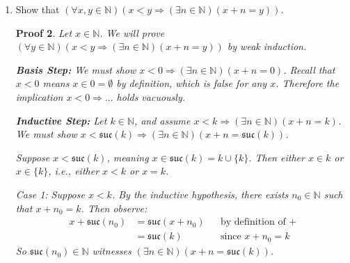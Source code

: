 \documentclass[12pt]{article}
\newcommand{\suc}{\mathfrak{suc}}
\newcommand{\N}{\mathbb{N}}
\theoremstyle{proofstyle}
\newtheorem*{proof*}{Proof}
\begin{document}
\begin{enumerate}[left=0pt, itemsep=2em, parsep=1em]
\begin{enumerate}[label=(\alph*), itemsep=1.5em, leftmargin=2em]
\begin{proof*}
  \medskip
  \textbf{Inductive Step:}
  Let $k \in \N$, and assume $x + k = k + x$. We observe the following.
  \begin{align*}
    x + \suc(k) &= \suc(x + k) &&\text{by definition of }+ \\
                &= \suc(k + x) &&\text{by the inductive hypothesis} \\
                &= \suc(k) + x &&\text{by part (a)}
  \end{align*}
  Therefore $x + \suc(k) = \suc(k) + x$ as desired.

  We can therefore conclude $(\forall y \in \N)(x + y = y + x)$, and since $x$ was arbitrary, $(\forall x, y \in \N)(x + y = y + x)$.
  \end{proof*}

\end{enumerate}

\newpage

\item Show that $(\forall x, y \in \N)(x < y \Rightarrow (\exists n \in \N)(x + n = y))$.

\begin{proof*}
Let $x \in \N$. We will prove $(\forall y \in \N)(x < y \Rightarrow (\exists n \in \N)(x + n = y))$ by weak induction.

\medskip
\textbf{Basis Step:}
We must show $x < 0 \Rightarrow (\exists n \in \N)(x + n = 0)$. Recall that $x < 0$ means $x \in 0 = \emptyset$ by definition, which is false for any $x$. Therefore the implication $x < 0 \Rightarrow \ldots$ holds vacuously.

\medskip
\textbf{Inductive Step:}
Let $k \in \N$, and assume $x < k \Rightarrow (\exists n \in \N)(x + n = k)$. We must show $x < \suc(k) \Rightarrow (\exists n \in \N)(x + n = \suc(k))$.

Suppose $x < \suc(k)$, meaning $x \in \suc(k) = k \cup \{k\}$. Then either $x \in k$ or $x \in \{k\}$, i.e., either $x < k$ or $x = k$.

\medskip
\textit{Case 1:} Suppose $x < k$. By the inductive hypothesis, there exists $n_0 \in \N$ such that $x + n_0 = k$. Then observe:
\begin{align*}
  x + \suc(n_0) &= \suc(x + n_0) &&\text{by definition of }+ \\
                &= \suc(k)        &&\text{since }x + n_0 = k
\end{align*}
So $\suc(n_0) \in \N$ witnesses $(\exists n \in \N)(x + n = \suc(k))$.


\end{proof*}
\end{enumerate}
\end{document}
